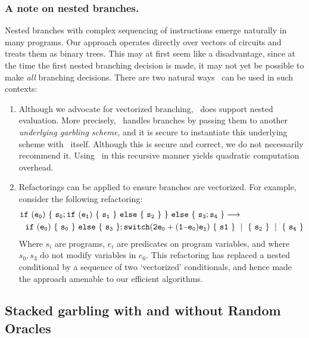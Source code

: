 \subsubsection{A note on nested branches.}
Nested branches with
complex sequencing of instructions emerge
naturally in many programs.
%
Our approach operates directly over vectors of circuits and treats
them as binary trees.
This may at first seem like a disadvantage, since at the
time the first nested branching decision is made, it may not yet be
possible to make \emph{all} branching decisions.
%
There are two natural ways \ourschemelong\ can be used in such
contexts:
%
\begin{enumerate}
  \item Although we advocate for vectorized branching,
    \ourschemelong\ does support nested evaluation.
    More precisely, \ourschemelong\ handles branches by passing them
    to another \emph{underlying
    garbling scheme}, and it is secure to instantiate this underlying
    scheme with \ourschemelong\ itself.
    Although this is secure and correct, we do not necessarily
    recommend it. Using \ourschemelong\ in this recursive manner
    yields quadratic computation overhead.
  \item Refactorings can be applied to ensure branches
    are vectorized. For example, consider the following refactoring:
    \begin{align*}
      &{ \tt if~(e_0)~\{~s_0 ;
      if~(e_1)~\{~s_1~\}~else~\{~s_2~\}~\}~else~\{~s_3 ; s_4~\}
    \longrightarrow}
    \\
      &~~{ \tt if~(e_0)~\{~s_0~\}~else~\{~s_3~\};
        switch (2e_0 + (1 \minus e_0)e_1)~\{~s1~\}~\mid~\{~s_2~\}~\mid~\{~s_4~\}
    }
    \end{align*}
    Where $s_i$ are programs, $e_i$ are predicates on program
    variables, and where $s_0, s_3$ do not modify variables in $e_0$.
    This refactoring has replaced a nested conditional by a sequence
    of two `vectorized' conditionals, and hence made the approach
    amenable to our efficient algorithms.
\end{enumerate}
%




\subsection{Stacked garbling with and without Random Oracles}
\label{sec:techOverviewRO}


